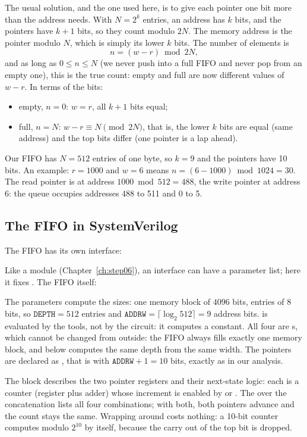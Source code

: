 The usual solution, and the one used here, is to give each pointer one bit
more than the address needs. With $N = 2^k$ entries, an address has $k$ bits,
and the pointers have $k+1$ bits, so they count modulo $2N$. The memory
address is the pointer modulo $N$, which is simply its lower $k$ bits. The
number of elements is
\[
  n = (w - r) \bmod 2N ,
\]
and as long as $0 \le n \le N$ (we never push into a full FIFO and never pop
from an empty one), this is the true count: empty and full are now different
values of $w - r$. In terms of the bits:
\begin{itemize}
\item empty, $n = 0$: $w = r$, all $k+1$ bits equal;
\item full, $n = N$: $w - r \equiv N \pmod{2N}$, that is, the lower $k$ bits
  are equal (same address) and the top bits differ (one pointer is a lap
  ahead).
\end{itemize}

Our FIFO has $N = 512$ entries of one byte, so $k = 9$ and the pointers have
10 bits. An example: $r = 1000$ and $w = 6$ means $n = (6 - 1000) \bmod 1024
= 30$. The read pointer is at address $1000 \bmod 512 = 488$, the write
pointer at address 6: the queue occupies addresses 488 to 511 and 0 to 5.

\subsection*{The FIFO in SystemVerilog}

The FIFO has its own interface:


Like a module (Chapter~\ref{ch:step06}), an interface can have a parameter
list; here it fixes . The FIFO itself:


The parameters compute the sizes: one memory block of $4096$ bits, entries
of $8$ bits, so $\mathtt{DEPTH} = 512$ entries and $\mathtt{ADDRW} =
\lceil \log_2 512 \rceil = 9$ address bits.  is evaluated by the
tools, not by the circuit: it computes a constant. All four are
s, which cannot be changed from outside: the FIFO always fills
exactly one memory block, and  below computes the same depth
from the same width. The pointers are declared
as , that is with $\mathtt{ADDRW}+1 = 10$ bits, exactly as
in our analysis.

The  block describes the two pointer registers and their
next-state logic: each is a counter (register plus adder) whose increment is
enabled by  or . The  over the
concatenation  lists all four
combinations; with both, both pointers advance and the count stays the same.
Wrapping around costs nothing: a 10-bit counter computes modulo $2^{10}$ by
itself, because the carry out of the top bit is dropped.

